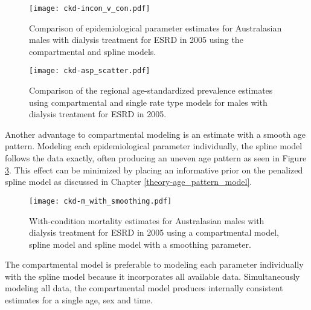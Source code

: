     \begin{figure}[h]
        \begin{center}
            \texttt{[image: ckd-incon\_v\_con.pdf]}
            \caption{Comparison of epidemiological parameter estimates
              for Australasian males with dialysis treatment for ESRD
              in 2005 using the compartmental and spline
              models.}
            \label{fig:app-CKD incon v con}
        \end{center}
    \end{figure}

    \begin{figure}[h]
        \begin{center}
            \texttt{[image: ckd-asp\_scatter.pdf]}
            \caption{Comparison of the regional age-standardized
              prevalence estimates using compartmental and single rate
              type models for males with dialysis treatment for ESRD in
              2005.}
            \label{fig:app-CKD asp}
        \end{center}
    \end{figure}

Another advantage to compartmental modeling is an estimate with a smooth
age pattern. Modeling each epidemiological parameter individually, the
spline model follows the data exactly, often producing an
uneven age pattern as seen in Figure \ref{fig:app-CKD smooth}.  This
effect can be minimized by placing an informative prior on the
penalized spline model as discussed in Chapter
\ref{theory-age_pattern_model}.

    \begin{figure}[h]
        \begin{center}
            \texttt{[image: ckd-m\_with\_smoothing.pdf]}
            \caption{With-condition mortality estimates for
              Australasian males with dialysis treatment for ESRD in
              2005 using a compartmental model, spline model
              and spline model with a smoothing parameter.}
            \label{fig:app-CKD smooth}
        \end{center}
    \end{figure}

The compartmental model is preferable to modeling each parameter
individually with the spline model because it incorporates all
available data.  Simultaneously modeling all data, the compartmental
model produces internally consistent estimates for a single age,
sex and time.
